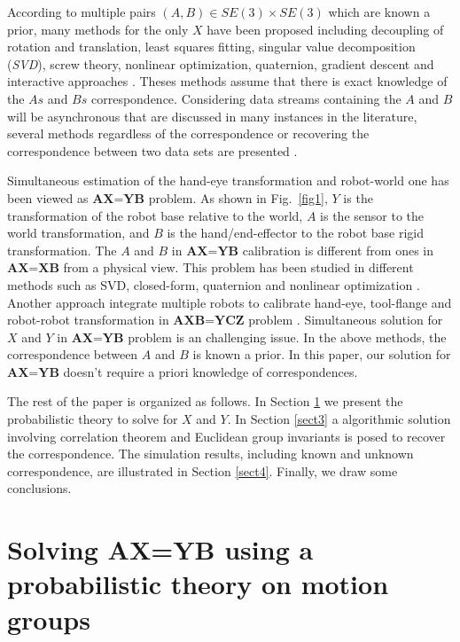 \documentclass[conference,letterpaper]{IEEEtran}
\begin{document}
According to multiple pairs $(A,B) \in SE(3) \times SE(3)$ which are known a prior, many methods for the only $X$ have been proposed including decoupling of rotation and translation, least squares fitting, singular value decomposition (\emph{SVD}), screw theory, nonlinear
optimization, quaternion, gradient descent and interactive approaches \cite{Shiu1989,Tsai1989,Wang1992,Park1994,Horaud1995,Daniilidis1999,Fassi2005,Zhao2011,Ackerman2014a}. Theses methods assume that there is exact knowledge of the $As$ and $Bs$ correspondence. Considering data streams containing the $A$ and $B$ will be asynchronous that are discussed in many instances
in the literature, several methods regardless of the correspondence or recovering the correspondence between two data sets are presented \cite{Ackerman2013a,Ackerman2013,Ackerman2014}.

Simultaneous estimation of the hand-eye transformation and robot-world one
has been viewed as $\textbf{AX=YB}$ problem. As shown in Fig.~\ref{fig1}, $Y$ is the transformation of the robot base relative to the world, $A$ is the sensor to the world transformation, and $B$ is the hand/end-effector to the robot base rigid transformation. The $A$ and $B$ in $\textbf{AX=YB}$ calibration is different from ones in $\textbf{AX=XB}$ from a physical view. This problem has been studied in different methods such as SVD, closed-form, quaternion and nonlinear optimization \cite{Zhuang1994,dornaika1998simultaneous,Hirsh2001, ernst2012non,strobl2006optimal,Li2010,Shah2013,Heller2014}. Another approach integrate multiple robots to calibrate hand-eye, tool-flange and robot-robot transformation in $\textbf{AXB=YCZ}$ problem \cite{Wang2014}. Simultaneous solution for $X$ and $Y$ in $\textbf{AX=YB}$ problem is an challenging issue. In the above methods, the correspondence between $A$ and $B$ is known a prior. In this paper, our solution for $\textbf{AX=YB}$ doesn't require a priori knowledge of correspondences.

The rest of the paper is organized as follows. In Section
\ref{sect2} we present the probabilistic theory to solve for $X$ and $Y$. In Section \ref{sect3} a algorithmic solution involving correlation theorem and Euclidean group invariants is posed to recover the correspondence. The simulation results, including known  and unknown correspondence, are illustrated in Section \ref{sect4}. Finally, we draw some conclusions.

\section{Solving AX=YB using a probabilistic theory on motion groups}
\label{sect2}
\end{document}
